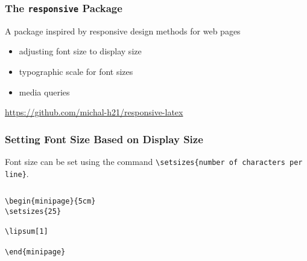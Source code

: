 \begin{frame}
  \frametitle{The \texttt{responsive} Package}

  A package inspired by responsive design methods for web pages
  \begin{itemize}
  \item adjusting font size to display size
  \item typographic scale for font sizes
  \item media queries
  \end{itemize}
  \url{https://github.com/michal-h21/responsive-latex}
\end{frame}

\begin{frame}[fragile]
  \frametitle{Setting Font Size Based on Display Size}

  Font size can be set using the command \verb|\setsizes{number of characters per line}|.
  
\begin{columns}
  \begin{column}{0.5\textwidth}
\begin{verbatim}
\begin{minipage}{5cm}
\setsizes{25}

\lipsum[1]

\end{minipage}
\end{verbatim}
\end{column}
\begin{column}{0.5\textwidth}
\end{column}
\end{columns}

\end{frame}

